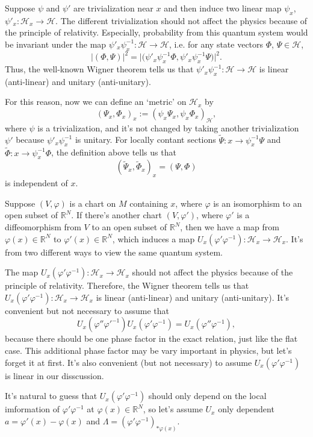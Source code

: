 \documentclass[12pt]{article}
\theoremstyle{definition}
\theoremstyle{plain}
\begin{document}
Suppose $\psi$ and $\psi'$ are trivialization near $x$ and then induce two linear map $\psi_x$, $\psi'_x:\mathcal H_x\to \mathcal H$. The different trivialization should not affect the physics because of the principle of relativity. Especially, probability from this quantum system would be invariant under the map $\psi'_x\psi^{-1}_x:\mathcal H\to \mathcal H$, i.e. for any state vectors $\Phi$, $\Psi\in \mathcal H$,
\[
	|(\Phi,\Psi)|^2=\bigl|\bigl(\psi'_x\psi^{-1}_x\Phi,\psi'_x\psi^{-1}_x\Psi\bigr)\bigr|^2.
\]
Thus, the well-known Wigner theorem tells us that $\psi'_x\psi^{-1}_x:\mathcal H\to \mathcal H$ is linear (anti-linear) and unitary (anti-unitary). 

For this reason, now we can define an `metric' on $\mathcal H_x$ by
\[
	(\Psi_x,\Phi_x)_x:=\left(\psi_x\Psi_x,\psi_x\Phi_x\right)_{\mathcal H},
\]
where $\psi$ is a trivialization, and it's not changed by taking another trivialization $\psi'$ because $\psi'_x\psi^{-1}_x$ is unitary. For locally contant sections $\widetilde \Psi:x\to \psi_x^{-1}\Psi$ and $\widetilde \Phi:x\to \psi_x^{-1}\Phi$, the definition above tells us that
\[
	(\widetilde \Psi_x,\widetilde \Phi_x)_x=(\Psi,\Phi)
\]
is independent of $x$.

Suppose $(V,\varphi)$ is a chart on $M$ containing $x$, where $\varphi$ is an isomorphism to an open subset of $\mathbb R^{N}$. If there's another chart $(V,\varphi')$, where $\varphi'$ is a diffeomorphism from $V$ to an open subset of $\mathbb R^{N}$, then we have a map from $\varphi(x)\in \mathbb R^N$ to $\varphi'(x)\in \mathbb R^N$, which induces a map $U_x(\varphi'\varphi^{-1}):\mathcal H_x\to \mathcal H_x$. It's from two different ways to view the same quantum system.

The map $U_x(\varphi'\varphi^{-1}):\mathcal H_x\to \mathcal H_x$ should not affect the physics because of the principle of relativity. Therefore, the Wigner theorem tells us that $U_x(\varphi'\varphi^{-1}):\mathcal H_x\to \mathcal H_x$ is linear (anti-linear) and unitary (anti-unitary). It's convenient but not necessary to assume that 
\[
	U_x(\varphi''\varphi'^{-1})U_x(\varphi'\varphi^{-1})=U_x(\varphi''\varphi^{-1}),
\] 
because there should be one phase factor in the exact relation, just like the flat case. This additional phase factor may be vary important in physics, but let's forget it at first. It's also convenient (but not necessary) to assume $U_x(\varphi'\varphi^{-1})$ is linear in our disscussion.

It's natural to guess that $U_x(\varphi'\varphi^{-1})$ should only depend on the local imformation of $\varphi'\varphi^{-1}$ at $\varphi(x)\in \mathbb R^N$, so let's assume $U_x$ only dependent $a=\varphi'(x)-\varphi(x)$ and $\Lambda=(\varphi'\varphi^{-1})_{*\varphi(x)}$.
\end{document}
